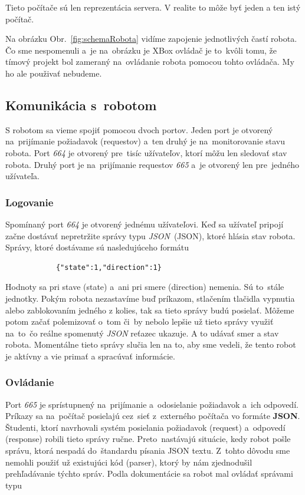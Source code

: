 \noindent Tieto počítače sú len reprezentácia servera. V realite to môže byť jeden a ten istý počítač.

\noindent Na obrázku Obr.~\ref{fig:schemaRobota} vidíme zapojenie jednotlivých častí robota. Čo sme nespomenuli a~je na~obrázku je XBox ovládač
je to~kvôli tomu, že tímový projekt bol zameraný na~ovládanie robota pomocou tohto ovládača. My ho ale použivať nebudeme.

\subsection{Komunikácia s~robotom}

S robotom sa vieme spojiť pomocou dvoch portov. Jeden port je otvorený na~prijímanie požiadavok (requestov) a~ten druhý je na~monitorovanie
stavu robota. Port \textit{664} je otvorený pre~tisíc užívateľov, ktorí môžu len sledovať stav robota. Druhý port je na~prijímanie requestov
\textit{665} a~je otvorený len pre~jedného užívateľa.

\subsubsection{Logovanie}
\label{sec:logovanie}

	Spomínaný port \textit{664} je otvorený jednému užívateľovi. Keď sa užívateľ pripojí začne dostávať nepretržite správy typu
	\textit{JSON}~(\acrlong{JSON}), ktoré hlásia stav robota. Správy, ktoré dostávame sú nasledujúceho formátu

	\begin{lstlisting}
			{"state":1,"direction":1}
	\end{lstlisting}

	Hodnoty sa pri stave (state) a~ani pri smere (direction) nemenia. Sú to~stále jednotky. Pokým robota nezastavíme buď príkazom, stlačením
	tlačidla vypnutia alebo zablokovaním jedného z kolies, tak sa tieto správy budú posielať. Môžeme potom začať polemizovať o~tom či~by nebolo
	lepšie už tieto správy využiť na~to~čo reálne spomenutý \textit{JSON} reťazec ukazuje. A to udávať smer a stav robota. Momentálne tieto správy
	slučia len na to, aby sme vedeli, že tento robot je aktívny a vie primať a spracúvať informácie.

\subsubsection{Ovládanie}
\label{sec:ovladanie}

	Port \textit{665} je sprístupnený na~prijímanie a~odosielanie požiadavok a~ich odpovedí. Príkazy sa na~počítač posielajú cez~sieť z~externého
	počítača vo formáte \textbf{JSON}. Študenti, ktorí navrhovali systém posielania požiadavok (request) a~odpovedí (response) robili tieto správy
	ručne. Preto~nastávajú situácie, kedy robot pošle správu, ktorá nespadá do~štandardu písania JSON textu. Z~tohto dôvodu sme nemohli použiť už
	existujúci kód (parser), ktorý by nám zjednodušil prehľadávanie týchto správ. Podla dokumentácie sa robot mal ovládať správami typu~\cite{BMdoc}

